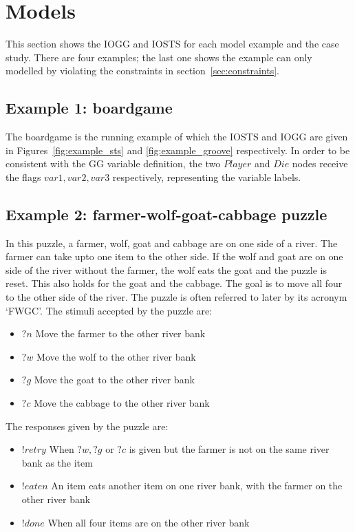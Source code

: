 \section{Models}\label{sec:model-examples}
This section shows the IOGG and IOSTS for each model example and the case study. There are four examples; the last one shows the example can only modelled by violating the constraints in section~\ref{sec:constraints}. 

\subsection{Example 1: boardgame}
The boardgame is the running example of which the IOSTS and IOGG are given in Figures~\ref{fig:example_sts} and \ref{fig:example_groove} respectively. In order to be consistent with the GG variable definition, the two $Player$ and $Die$ nodes receive the flags $\mathit{var1, var2, var3}$ respectively, representing the variable labels.

\subsection{Example 2: farmer-wolf-goat-cabbage puzzle}\label{sec:fwgc}
In this puzzle, a farmer, wolf, goat and cabbage are on one side of a river. The farmer can take upto one item to the other side. If the wolf and goat are on one side of the river without the farmer, the wolf eats the goat and the puzzle is reset. This also holds for the goat and the cabbage. The goal is to move all four to the other side of the river. The puzzle is often referred to later by its acronym `FWGC'. The stimuli accepted by the puzzle are:
\begin{itemize}
\item $?n$ Move the farmer to the other river bank
\item $?w$ Move the wolf to the other river bank
\item $?g$ Move the goat to the other river bank
\item $?c$ Move the cabbage to the other river bank
\end{itemize}
The responses given by the puzzle are:
\begin{itemize}
\item $!retry$ When $?w, ?g$ or $?c$ is given but the farmer is not on the same river bank as the item
\item $!eaten$ An item eats another item on one river bank, with the farmer on the other river bank 
\item $!done$ When all four items are on the other river bank
\end{itemize}

